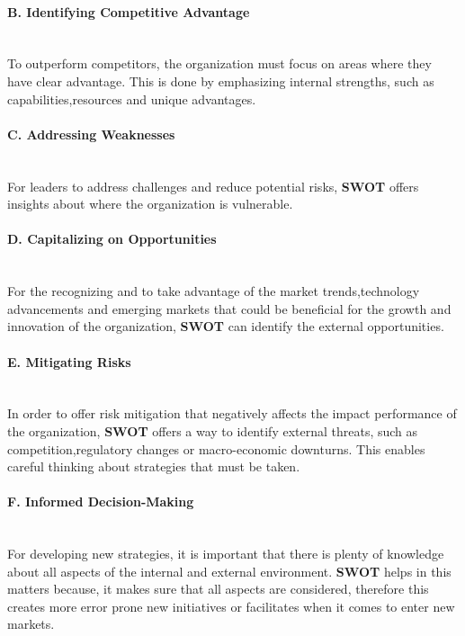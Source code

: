 \paragraph{B. Identifying Competitive Advantage}\mbox{}\\
To outperform competitors, the organization must focus on areas where they have clear advantage. This is done by emphasizing internal strengths, such as capabilities,resources and unique advantages.

\paragraph{C. Addressing Weaknesses}\mbox{}\\
For leaders to address challenges and reduce potential risks, \textbf{SWOT} offers insights about where the organization is vulnerable.

\paragraph{D. Capitalizing on Opportunities}\mbox{}\\
For the recognizing and to take advantage of the market trends,technology advancements and emerging markets that could be beneficial for the growth and innovation of the organization, \textbf{SWOT} can identify the external opportunities.

\paragraph{E. Mitigating Risks}\mbox{}\\
In order to offer risk mitigation that negatively affects the impact performance of the organization, \textbf{SWOT} offers a way to identify external threats, such as competition,regulatory changes or macro-economic downturns. This enables careful thinking about strategies that must be taken.

\paragraph{F. Informed Decision-Making}\mbox{}\\
For developing new strategies, it is important that there is plenty of knowledge about all aspects of the internal and external environment. \textbf{SWOT} helps in this matters because, it makes sure that all aspects are considered, therefore this creates more error prone new initiatives or facilitates when it comes to enter new markets.


